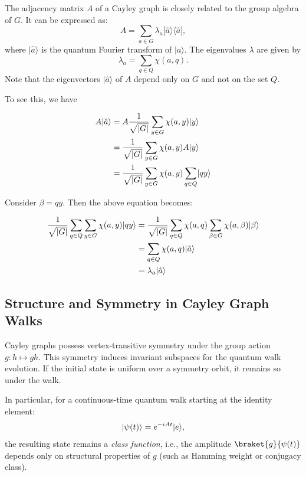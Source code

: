 \documentclass[12pt]{report}
\begin{document}
The adjacency matrix $A$ of a Cayley graph is closely related to the group algebra of $G$. It can be expressed as:
\[
A = \sum_{a \in G} \lambda_a |\hat{a}\rangle \langle \hat{a}|,
\]
where $|\hat{a}\rangle$ is the quantum Fourier transform of $|a\rangle$. The eigenvalues $\lambda$ are given by
\[
\lambda_a = \sum_{q \in Q} \chi(a, q).
\]
Note that the eigenvectors $|\hat{a}\rangle$ of $A$ depend only on $G$ and not on the set $Q$.

To see this, we have

        \begin{align}
            A\lvert\hat{a}\rangle 
            &= A\frac{1}{\sqrt{|G|}}\sum_{y \in G}\chi(a,y)\lvert y\rangle \nonumber \\
            &= \frac{1}{\sqrt{|G|}}\sum_{y \in G}\chi(a,y)A\lvert y\rangle \nonumber \\
            &= \frac{1}{\sqrt{|G|}}\sum_{y \in G}\chi(a,y)\sum_{q \in Q}\lvert qy\rangle \nonumber
            \end{align}
            
            \noindent Consider $\beta = qy$. Then the above equation becomes:
            
            \begin{align}
            \frac{1}{\sqrt{|G|}}\sum_{q \in Q} \sum_{y \in G} \chi(a,y)\lvert qy\rangle 
            &= \frac{1}{\sqrt{|G|}}\sum_{q \in Q} \chi(a,q) \sum_{\beta \in G} \chi(a,\beta)\lvert\beta\rangle \nonumber \\
            &= \sum_{q \in Q} \chi(a,q)\lvert\hat{a}\rangle \nonumber \\
            &= \lambda_a\lvert\hat{a}\rangle \label{eq:group_action_walk}
            \end{align}
            


\subsection{Structure and Symmetry in Cayley Graph Walks}

Cayley graphs possess vertex-transitive symmetry under the group action $g : h \mapsto gh$. This symmetry induces invariant subspaces for the quantum walk evolution. If the initial state is uniform over a symmetry orbit, it remains so under the walk.

In particular, for a continuous-time quantum walk starting at the identity element:
\[
\lvert\psi(t)\rangle = e^{-iAt} \lvert e\rangle,
\]
the resulting state remains a \emph{class function}, i.e., the amplitude $\braket{g}{\psi(t)}$ depends only on structural properties of $g$ (such as Hamming weight or conjugacy class).
\end{document}

